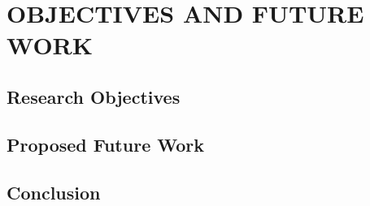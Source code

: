 %
%

\chapter{OBJECTIVES AND FUTURE WORK}

\section{Research Objectives}

\section{Proposed Future Work}

\section{Conclusion}